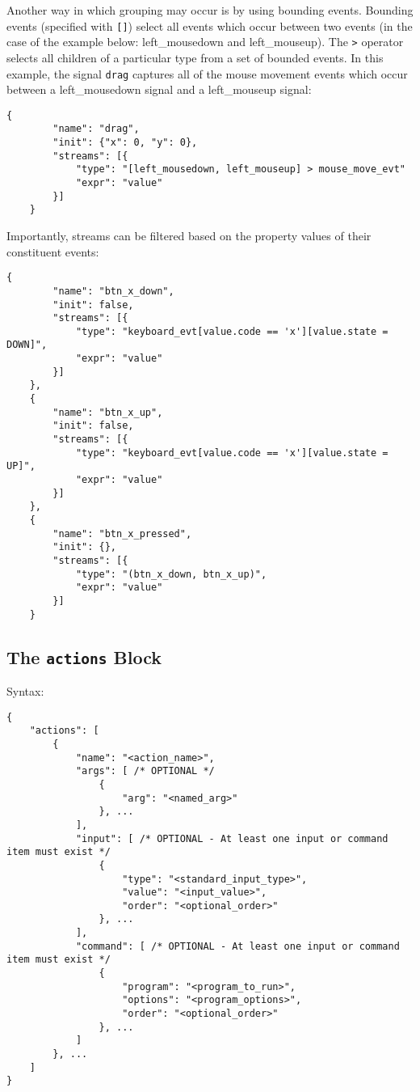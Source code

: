 \documentclass{article}
\begin{document}
Another way in which grouping may occur is by using bounding events. Bounding events (specified with \texttt{[]}) select all events which occur between two events (in the case of the example below: left\_mousedown and left\_mouseup). The \texttt{>} operator selects all children of a particular type from a set of bounded events. In this example, the signal \texttt{drag} captures all of the mouse movement events which occur between a left\_mousedown signal and a left\_mouseup signal:

\begin{Verbatim}[baselinestretch=1.0]
    {
        "name": "drag",
        "init": {"x": 0, "y": 0},
        "streams": [{
            "type": "[left_mousedown, left_mouseup] > mouse_move_evt"
            "expr": "value"
        }]
    }
\end{Verbatim}

Importantly, streams can be filtered based on the property values of their constituent events:

\begin{Verbatim}[baselinestretch=1.0]
    {
        "name": "btn_x_down",
        "init": false,
        "streams": [{ 
            "type": "keyboard_evt[value.code == 'x'][value.state = DOWN]",
            "expr": "value"
        }]
    },
    {
        "name": "btn_x_up",
        "init": false,
        "streams": [{ 
            "type": "keyboard_evt[value.code == 'x'][value.state = UP]",
            "expr": "value"
        }]
    },
    {
        "name": "btn_x_pressed",
        "init": {},
        "streams": [{ 
            "type": "(btn_x_down, btn_x_up)",
            "expr": "value"
        }]
    }
\end{Verbatim}

\subsection{The \texttt{actions} Block}
Syntax:

\begin{Verbatim}[baselinestretch=1.0]
{
    "actions": [
        {
            "name": "<action_name>",
            "args": [ /* OPTIONAL */
                { 
                    "arg": "<named_arg>"
                }, ...
            ],
            "input": [ /* OPTIONAL - At least one input or command item must exist */
                {
                    "type": "<standard_input_type>",
                    "value": "<input_value>",
                    "order": "<optional_order>"
                }, ...
            ],
            "command": [ /* OPTIONAL - At least one input or command item must exist */
                {
                    "program": "<program_to_run>",
                    "options": "<program_options>",
                    "order": "<optional_order>"
                }, ...
            ]
        }, ...
    ]
}
\end{Verbatim}
\end{document}
